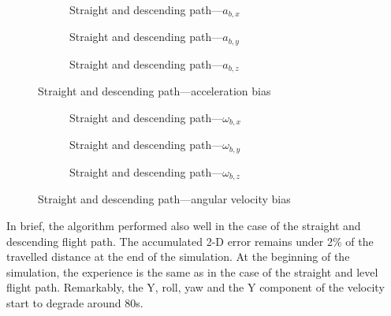 \begin{figure}[H]
    \centering
    \begin{subfigure}{0.3\textwidth}
        
        \caption{Straight and descending path---$a_{b,x}$}
    \end{subfigure}
    \hfill
    \begin{subfigure}{0.3\textwidth}
        
        \caption{Straight and descending path---$a_{b,y}$}
    \end{subfigure}
    \hfill
    \begin{subfigure}{0.3\textwidth}
        
        \caption{Straight and descending path---$a_{b,z}$}
    \end{subfigure}
    \caption{Straight and descending path---acceleration bias}\label{fig:straight-descending-abias}
\end{figure}

\begin{figure}[H]
    \centering
    \begin{subfigure}{0.3\textwidth}
        
        \caption{Straight and descending path---$\omega_{b,x}$}
    \end{subfigure}
    \hfill
    \begin{subfigure}{0.3\textwidth}
        
        \caption{Straight and descending path---$\omega_{b,y}$}
    \end{subfigure}
    \hfill
    \begin{subfigure}{0.3\textwidth}
        
        \caption{Straight and descending path---$\omega_{b,z}$}
    \end{subfigure}
    \caption{Straight and descending path---angular velocity bias}\label{fig:straight-descending-wbias}
\end{figure}

In brief, the algorithm performed also well in the case of the straight and descending flight path. The accumulated 2-D error remains under 2\% of the travelled distance at the end of the simulation. At the beginning of the simulation, the experience is the same as in the case of the straight and level flight path. Remarkably, the Y, roll, yaw and the Y component of the velocity start to degrade around 80\si{\second}.

